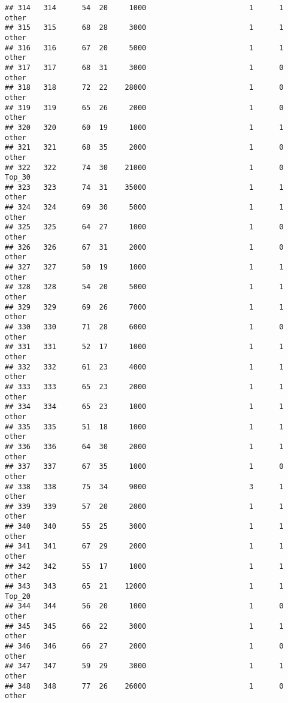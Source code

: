 \documentclass[
]{article}
\begin{document}
\begin{verbatim}
## 314   314      54  20     1000                        1      1    other
## 315   315      68  28     3000                        1      1    other
## 316   316      67  20     5000                        1      1    other
## 317   317      68  31     3000                        1      0    other
## 318   318      72  22    28000                        1      0    other
## 319   319      65  26     2000                        1      0    other
## 320   320      60  19     1000                        1      1    other
## 321   321      68  35     2000                        1      0    other
## 322   322      74  30    21000                        1      0   Top_30
## 323   323      74  31    35000                        1      1    other
## 324   324      69  30     5000                        1      1    other
## 325   325      64  27     1000                        1      0    other
## 326   326      67  31     2000                        1      0    other
## 327   327      50  19     1000                        1      1    other
## 328   328      54  20     5000                        1      1    other
## 329   329      69  26     7000                        1      1    other
## 330   330      71  28     6000                        1      0    other
## 331   331      52  17     1000                        1      1    other
## 332   332      61  23     4000                        1      1    other
## 333   333      65  23     2000                        1      1    other
## 334   334      65  23     1000                        1      1    other
## 335   335      51  18     1000                        1      1    other
## 336   336      64  30     2000                        1      1    other
## 337   337      67  35     1000                        1      0    other
## 338   338      75  34     9000                        3      1    other
## 339   339      57  20     2000                        1      1    other
## 340   340      55  25     3000                        1      1    other
## 341   341      67  29     2000                        1      1    other
## 342   342      55  17     1000                        1      1    other
## 343   343      65  21    12000                        1      1   Top_20
## 344   344      56  20     1000                        1      0    other
## 345   345      66  22     3000                        1      1    other
## 346   346      66  27     2000                        1      0    other
## 347   347      59  29     3000                        1      1    other
## 348   348      77  26    26000                        1      0    other

\end{verbatim}
\end{document}
